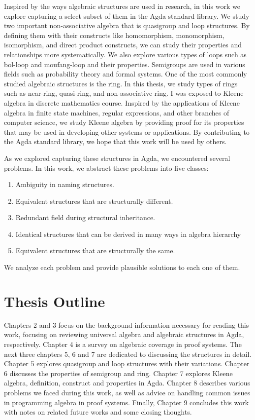 Inspired by the ways algebraic structures are used in research, in this work we
explore capturing a select subset of them in the Agda standard library. We study
two important non-associative algebra that is quasigroup and loop structures. By
defining them with their constructs like homomorphism, monomorphism,
isomorphism, and direct product constructs, we can study their properties and
relationships more systematically. We also explore various types of loops such
as bol-loop and moufang-loop and their properties. Semigroups are used in
various fields such as probability theory and formal systems. One of the most
commonly studied algebraic structures is the ring. In this thesis, we study
types of rings such as near-ring, quasi-ring, and non-associative ring. I was
exposed to Kleene algebra in discrete mathematics course. Inspired by the
applications of Kleene algebra in finite state machines, regular expressions,
and other branches of computer science, we study Kleene algebra by providing
proof for its properties that may be used in developing other systems or
applications. By contributing to the Agda standard library, we hope that this
work will be used by others. 

As we explored capturing these structures in Agda, we encountered several
problems. In this work, we abstract these problems into five classes:
\begin{enumerate}
\item Ambiguity in naming structures.
\item Equivalent structures that are structurally different.
\item Redundant field during structural inheritance.
\item Identical structures that can be derived in many ways in algebra hierarchy
\item Equivalent structures that are structurally the same.
\end{enumerate}
We analyze each problem and provide plausible solutions to each one of them.

\section{Thesis Outline}
Chapters 2 and 3 focus on the background information necessary for reading this
work, focusing on reviewing universal algebra and algebraic structures in Agda,
respectively. Chapter 4 is a survey on algebraic coverage in proof systems. The
next three chapters 5, 6 and 7 are dedicated to discussing the structures in
detail. Chapter 5 explores quasigroup and loop structures with their variations.
Chapter 6 discusses the properties of semigroup and ring. Chapter 7 explores
Kleene algebra, definition, construct and properties in Agda. Chapter 8
describes various problems we faced during this work, as well as advice on
handling common issues in programming algebra in proof systems. Finally,
Chapter 9 concludes this work with notes on related future works and some
closing thoughts.
